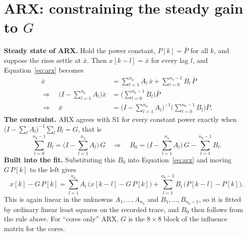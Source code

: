 \documentclass[11pt,a4paper]{article}
\begin{document}
\section{ARX: constraining the steady gain to \texorpdfstring{$G$}{G}}\label{app:arx}
\textbf{Steady state of ARX.} Hold the power constant, $P[k] = \bar P$ for all $k$, and suppose the
rises settle at $\bar x$. Then $x[k-l] = \bar x$ for every lag $l$, and Equation~\eqref{eq:arx}
becomes
\begin{align*}
  \bar x &= \sum_{l=1}^{n_a} A_l\, \bar x + \sum_{l=0}^{n_b-1} B_l\, \bar P\\
  \Longrightarrow\quad \Big(I - \sum_{l=1}^{n_a} A_l\Big)\bar x
         &= \Big(\sum_{l=0}^{n_b-1} B_l\Big)\bar P\\
  \Longrightarrow\quad \bar x
         &= \Big(I - \sum_{l=1}^{n_a} A_l\Big)^{-1}\Big(\sum_{l=0}^{n_b-1} B_l\Big)\bar P .
\end{align*}
\textbf{The constraint.} ARX agrees with S1 for every constant power exactly when
$\big(I - \sum_l A_l\big)^{-1}\sum_l B_l = G$, that is
\[
  \sum_{l=0}^{n_b-1} B_l = \Big(I - \sum_{l=1}^{n_a} A_l\Big)\,G
  \quad\Longrightarrow\quad
  B_0 = \Big(I - \sum_{l=1}^{n_a} A_l\Big)\,G - \sum_{l=1}^{n_b-1} B_l .
\]
\textbf{Built into the fit.} Substituting this $B_0$ into Equation~\eqref{eq:arx} and moving
$G\,P[k]$ to the left gives
\[
  x[k] - G\,P[k] = \sum_{l=1}^{n_a} A_l\,\big(x[k-l] - G\,P[k]\big)
                 + \sum_{l=1}^{n_b-1} B_l\,\big(P[k-l] - P[k]\big).
\]
This is again linear in the unknowns $A_1,\dots,A_{n_a}$ and $B_1,\dots,B_{n_b-1}$, so it is
fitted by ordinary linear least squares on the recorded trace, and $B_0$ then follows from the rule
above. For ``cores only'' ARX, $G$ is the $8\times8$ block of the influence matrix for the cores.
\end{document}
